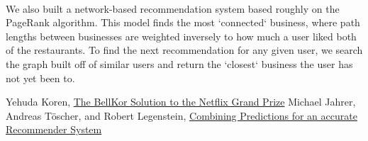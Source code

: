 \documentclass[11pt]{article}
\begin{document}
\paragraph{} We also built a network-based recommendation system based roughly on the PageRank algorithm. This model finds the most `connected` business, where path lengths between businesses are weighted inversely to how much a user liked both of the restaurants. To find the next recommendation for any given user, we search the graph built off of similar users and return the `closest` business the user has not yet been to.

\begin{thebibliography}{9}
  Yehuda Koren,
  \href{http://netflixprize.com/assets/GrandPrize2009_BPC_BellKor.pdf}{The BellKor Solution to the Netflix Grand Prize}
  Michael Jahrer, Andreas Töscher, and Robert Legenstein,
  \href{http://www.igi.tugraz.at/psfiles/JahrerETAL_2010.pdf}{Combining Predictions for an accurate Recommender System}

\end{thebibliography}
\end{document}
